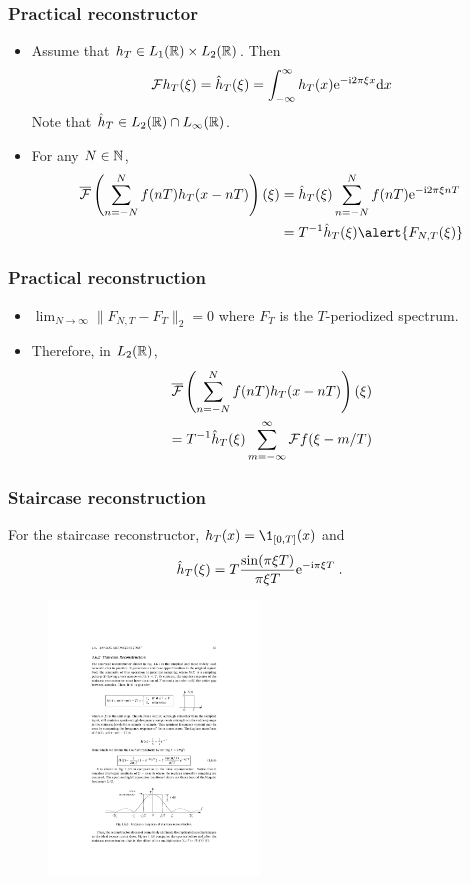 \begin{frame}
\frametitle{Practical reconstructor}
\begin{itemize}
\item Assume that $h_T \in L_1(\mathbb{R}) \times L_2(\mathbb{R})$. Then
$$
\mathcal{F} h_T (\xi)= \hat{h}_T(\xi)= \int_{-\infty}^\infty h_T(x) \mathrm{e}^{-\mathrm{i} 2 \pi \xi x} \mathrm{d} x
$$
Note that $\hat{h}_T \in L_2(\mathbb{R}) \cap L_\infty(\mathbb{R})$.
\item For any $N \in \mathbb{N}$,
\begin{align*}
\TFAC{\sum_{n=-N}^{N} f(nT) h_T(x - nT)}(\xi)
&= \hat{h}_T(\xi) \sum_{n=-N}^N f(nT) \rme^{-\rmi 2 \pi \xi nT} \\
&= T^{-1} \hat{h}_T(\xi) \alert{F_{N,T}(\xi)}
\end{align*}
\end{itemize}

\end{frame}

\begin{frame}
\frametitle{Practical reconstruction}
\begin{itemize}
\item $\lim_{N \to \infty} \| F_{N,T} - F_T \|_2= 0$ where $F_T$ is the $T$-periodized spectrum.
\item Therefore, in $L_2(\mathbb{R})$,
\alert{\begin{multline*}
\overline{\mathcal{F}}\left( \sum_{n=-N}^{N} f(nT) h_T(x - nT) \right)(\xi) \\
= T^{-1} \hat{h}_T(\xi) \sum_{m=-\infty}^\infty \mathcal{F} f(\xi -  m/T)
\end{multline*}}
\end{itemize}

\end{frame}

\begin{frame}
\frametitle{Staircase reconstruction}
For the staircase reconstructor, $h_T(x) = \1_{[0,T]}(x)$ and
\[
\hat{h}_T(\xi)= T \frac{\sin(\pi \xi T)}{\pi \xi T} \mathrm{e}^{-\mathrm{i} \pi \xi T} \;.
\]
\begin{figure}
  \centering
  \includegraphics[width=0.5\textwidth]{staircasefourier}
\end{figure}
\end{frame}

